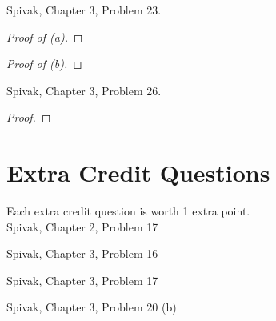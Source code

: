 \documentclass{article} %
\theoremstyle{plain}
\theoremstyle{definition}
\begin{document}
 
 
  \noindent {} Spivak, Chapter 3, Problem 23. 


  \begin{proof}[Proof of (a)]  \end{proof} 
  
    \begin{proof}[Proof of (b)]  \end{proof} 
    
     \noindent {} Spivak, Chapter 3, Problem 26. 
 
 
     \begin{proof} \end{proof} 
    
\section{Extra Credit Questions} 

Each extra credit question is worth 1 extra point. \\

\noindent{} Spivak, Chapter 2, Problem 17

\smallskip

\noindent{} Spivak, Chapter 3, Problem 16

\smallskip


\noindent{} Spivak, Chapter 3, Problem 17

\smallskip


\noindent{} Spivak, Chapter 3, Problem 20 (b)




    
    
\end{document}
